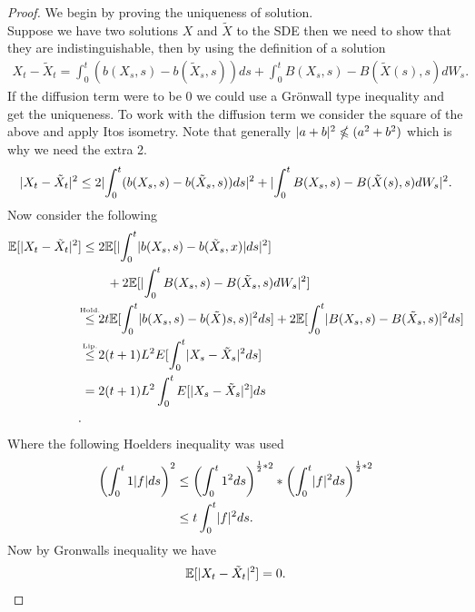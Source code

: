 \begin{proof}
  We begin by proving the uniqueness of solution. \\[1ex] 
  Suppose we have two solutions $X$ and $\tilde{X} $ to the SDE then we need to show that they are indistinguishable,
  then by using the definition of a solution 
  \begin{align*}
    X_t - \tilde{X}_t = \int_0^{t} (b(X_s,s) - b(\tilde{X}_s,s )) ds + \int_0^{t} B(X_s,s) - B(\tilde{X}(s),s )  dW_s
  .\end{align*}
  If the diffusion term were to be 0 we could use a Grönwall type inequality and get the uniqueness. 
  To work with the diffusion term we consider the square of the above and apply Itos isometry. Note that
  generally $\lvert a+b\rvert^2 \nleqslant  (a^2+b^2)$  which is why we need the extra 2.
  \begin{align*}
    \lvert X_t - \tilde{X}_t\rvert^2 \le  2\lvert\int_0^{t} (b(X_s,s) - b(\tilde{X}_s,s )) ds\rvert^2 + \lvert\int_0^{t} B(X_s,s) - B(\tilde{X}(s),s )  dW_s\rvert^2
  .\end{align*}
  Now consider the following 
  \begin{align*}
    \E[\abs{X_t-\tilde{X}_t}^2] &\le 2\E[\abs{\int_0^{t} \abs{b(X_s,s) - b(\tilde{X}_s,x )} ds}^2 ]  \\
                                & \qquad + 2 \E[\abs{\int_0^{t} B(X_s,s) - B(\tilde{X}_s,s ) dW_s}^2]\\
                                &\myS{Hold.}{\le } 2t \E[\int_0^{t} \abs{b(X_s,s) - b(\tilde{X})s,s )}^2 ds ] + 2\E[\int_0^{t} \abs{B(X_s,s)-B(\tilde{X}_s,s )}^2 ds ] \\
                                &\myS{Lip.}{\le } 2(t+1)L^2 E[\int_0^{t} \abs{X_s-\tilde{X}_s }^2 ds ]\\
                                &= 2(t+1)L^2 \int_0^{t} E[\abs{X_s-\tilde{X}_s }^2  ]ds\\
  .\end{align*}
 Where the following Hoelders inequality was used 
 \begin{align*}
   \left( \int_0^{t} 1 \lvert f\rvert ds  \right)^2 &\le  \left( \int_0^{t} 1^2 ds  \right)^{\frac{1}{2}*2}*\left( \int_0^{t} \lvert f\rvert^2 ds  \right)^{\frac{1}{2}*2}  \\
                                             &\le t \int_0^{t} \lvert f\rvert^2 ds 
 .\end{align*}
 Now by Gronwalls inequality we have 
 \begin{align*}
   \mathbb{E}[\lvert X_t-\tilde{X}_t \rvert^2] = 0
 .\end{align*}

\end{proof}
